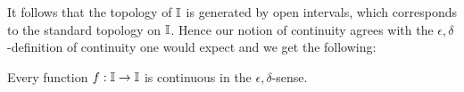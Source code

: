 %
  It follows that the topology of $\mathbb{I}$ is generated by open intervals, 
  which corresponds to the standard topology on $\mathbb{I}$. 
  Hence our notion of continuity agrees with the 
  $\epsilon,\delta$-definition of continuity one would expect and we get the following:
\begin{theorem}
  Every function $f:\mathbb{I}\to \mathbb{I}$ is continuous in the $\epsilon,\delta$-sense. 
\end{theorem}

